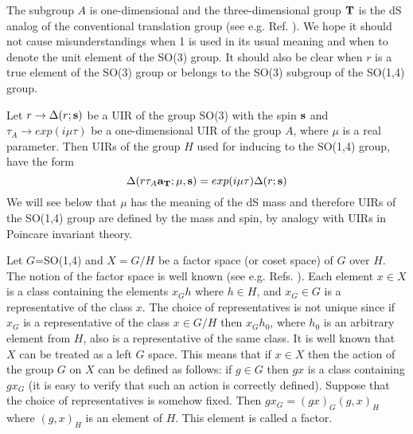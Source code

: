 \documentclass[a4paper,12pt]{article}%
\begin{document}
The subgroup $A$ is one-dimensional and the three-dimensional
group ${\bf T}$ is the dS analog of the conventional
translation group (see e.g. Ref. \cite{Men}). We hope it 
should not cause misunderstandings when 1 is used in its
usual meaning and when to denote the unit element of the
SO(3) group. It should also be clear when $r$ is a true
element of the SO(3) group or belongs to the SO(3) subgroup
of the SO(1,4) group. 

Let $r\rightarrow \Delta(r;{\bf s})$ be a UIR of the group
SO(3) with the spin ${\bf s}$ and 
$\tau_A\rightarrow exp(i\mu\tau)$ be a
one-dimensional UIR of the group $A$, where $\mu$ is a real
parameter. Then UIRs of the group $H$ used for inducing to
the SO(1,4) group, have the form
\begin{equation}
\Delta(r\tau_A{\bf a}_{\bf T};\mu,{\bf s})=
exp(i\mu\tau)\Delta(r;{\bf s})
\label{6}
\end{equation} 
We will see below that $\mu$ has the meaning of the dS
mass and therefore UIRs of the SO(1,4) group are
defined by the mass and spin, by analogy with UIRs
in Poincare invariant theory.

Let $G$=SO(1,4) and $X=G/H$ be a factor space (or
coset space) of $G$ over $H$. The notion of the factor 
space is well known (see e.g. Refs. 
\cite{Naimark,Dobrev,Str,Men,Barut}).
Each element $x\in X$ is a class containing the
elements $x_Gh$ where $h\in H$, and $x_G\in G$ is a
representative of the class $x$. The choice of
representatives is not unique since if $x_G$ is
a representative of the class $x\in G/H$ then
$x_Gh_0$, where $h_0$ is an arbitrary element
from $H$, also is a representative of the same 
class. It is well known that $X$ can be treated 
as a left $G$ space. This means that if $x\in X$
then the action of the group $G$ on $X$ can be
defined as follows: if $g\in G$ then $gx$ is a
class containing $gx_G$ (it is easy to verify
that such an action is correctly defined). 
Suppose that the choice of representatives
is somehow fixed. Then $gx_G=(gx)_G(g,x)_H$
where $(g,x)_H$ is an element of $H$. This
element is called a factor.
\end{document}

